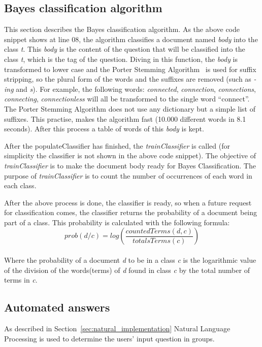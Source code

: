 \subsection{Bayes classification algorithm}
This section describes the Bayes classification algorithm. As the above code snippet shows at line 08, the algorithm classifies a document named \emph{body} into the class \emph{t}. This \emph{body} is the content of the question that will be classified into the class \emph{t}, which is the tag of the question. Diving in this function, the \emph{body} is transformed to lower case and the Porter Stemming Algorithm~\citep{porter1980algorithm} is used for suffix stripping, so the plural form of the words and the suffixes are removed (such as \emph{-ing} and \emph{s}). For example, the following words: {\it connected}, {\it connection}, {\it connections}, {\it connecting}, {\it connectionless} will all be transformed to the single word ``connect''. The Porter Stemming Algorithm does not use any dictionary but a simple list of suffixes. This practise, makes the algorithm fast (10.000 different words in 8.1 seconds). After this process a table of words of this \emph{body} is kept.

After the populateClassifier has finished, the \emph{trainClassifier} is called (for simplicity the classifier is not shown in the above code snippet). The objective of \emph{trainClassifier} is to make the document body ready for Bayes Classification. The purpose of \emph{trainClassifier} is to count the number of occurrences of each word in each class.

After the above process is done, the classifier is ready, so when a future request for classification comes, the classifier returns the probability of a document being part of a class. This probability is calculated with the following formula:
\\
\[prob(d / c) = log\left ( \frac{countedTerms(d, c)}{totalsTerms(c)} \right )\]
\\
Where the probability of a document {\it d} to be in a class {\it c} is the logarithmic value of the division of the words(terms) of {\it d} found in class {\it c} by the total number of terms in {\it c}.

\subsection{Automated answers}
\label{sec:example_nlp}
As described in Section~\ref{sec:natural_implementation} Natural Language Processing is used to determine the users' input question in groups. 

